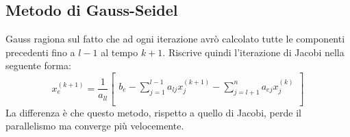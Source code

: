 \subsection{Metodo di Gauss-Seidel}
Gauss ragiona sul fatto che ad ogni iterazione avrò calcolato tutte le componenti precedenti fino a $l-1$ al tempo $k+1$. Riscrive quindi l'iterazione di Jacobi nella seguente forma:
\begin{equation}
	x_e^{(k+1)} = \frac{1}{a_{ll}} \begin{bmatrix}\\
		b_e-\sum_{j=1}^{l-1}a_{lj}x_j^{(k+1)}-\sum_{j=l+1}^{n}a_{ej}x_j^{(k)}\\\\
	\end{bmatrix}
\end{equation}
La differenza è che questo metodo, rispetto a quello di Jacobi, perde il parallelismo ma converge più velocemente.

